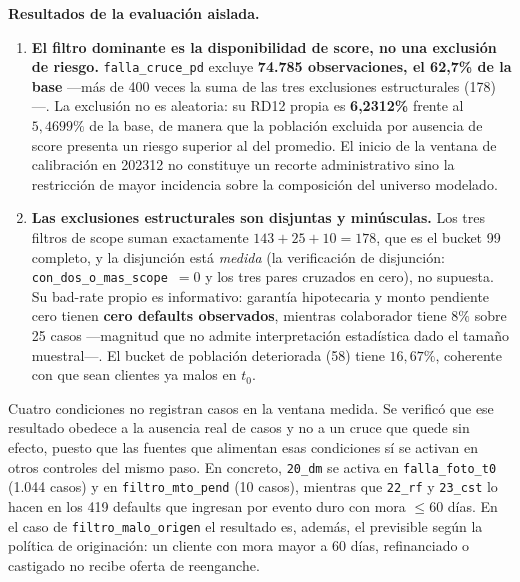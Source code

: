 \documentclass[12pt, a4paper]{article}
\begin{document}
\noindent\textbf{Resultados de la evaluación aislada.}

\begin{enumerate}[nosep]
  \item \textbf{El filtro dominante es la disponibilidad de score, no una exclusión de riesgo.} \texttt{falla\_cruce\_pd} excluye \textbf{74.785 observaciones, el
    62,7\% de la base} ---más de 400 veces la suma de las tres exclusiones estructurales (178)---.
    La exclusión no es aleatoria: su RD12 propia es \textbf{6,2312\%} frente al $5{,}4699\%$ de la
    base, de manera que la población excluida por ausencia de score presenta un riesgo superior al
    del promedio. El inicio
    de la ventana de calibración en 202312 no constituye un recorte administrativo sino la
    restricción de mayor incidencia sobre la composición del universo modelado.
  \item \textbf{Las exclusiones estructurales son disjuntas y minúsculas.} Los tres filtros de
    scope suman exactamente $143+25+10=178$, que es el bucket 99 completo, y la disjunción está
    \emph{medida} (la verificación de disjunción: \texttt{con\_dos\_o\_mas\_scope}~$=0$ y los tres pares
    cruzados en cero), no supuesta. Su bad-rate propio es informativo: garantía hipotecaria y monto
    pendiente cero tienen \textbf{cero defaults observados}, mientras colaborador tiene $8\%$ sobre
    25 casos ---magnitud que no admite interpretación estadística dado el tamaño muestral---. El bucket de población deteriorada (58)
    tiene $16{,}67\%$, coherente con que sean clientes ya malos en $t_0$.
\end{enumerate}

\noindent Cuatro condiciones no registran casos en la ventana medida. Se verificó que ese resultado obedece a la ausencia real de casos y no a un cruce que quede sin efecto, puesto que las fuentes que alimentan esas condiciones sí se activan en otros controles del mismo paso. En concreto, \texttt{20\_dm} se activa en \texttt{falla\_foto\_t0} (1.044 casos) y en \texttt{filtro\_mto\_pend} (10 casos), mientras que \texttt{22\_rf} y \texttt{23\_cst} lo hacen en los 419 defaults que ingresan por evento duro con mora $\le60$ días. En el caso de \texttt{filtro\_malo\_origen} el resultado es, además, el previsible según la política de originación: un cliente con mora mayor a 60 días, refinanciado o castigado no recibe oferta de reenganche.
\end{document}
